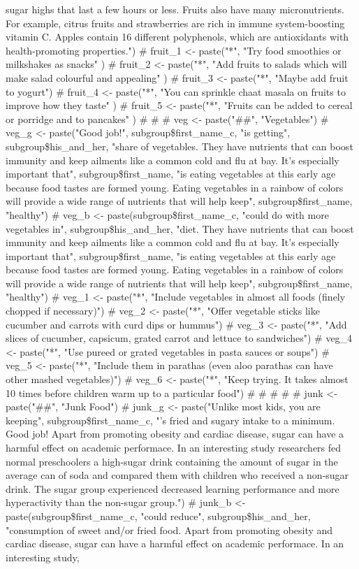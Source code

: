 \documentclass[]{article}
\begin{document}
sugar highs that last a few hours or less. Fruits also have many micronutrients. For example, citrus fruits and strawberries are rich in immune system-boosting vitamin C. Apples contain 16 different polyphenols, which are antioxidants with health-promoting properties.") \# fruit\_1 \textless{}- paste("*", "Try food smoothies or milkshakes as snacks" ) \# fruit\_2 \textless{}- paste("*", "Add fruits to salads which will make salad colourful and appealing" ) \# fruit\_3 \textless{}- paste("*", "Maybe add fruit to yogurt") \# fruit\_4 \textless{}- paste("*", "You can sprinkle chaat masala on fruits to improve how they taste" ) \# fruit\_5 \textless{}- paste("*", "Fruits can be added to cereal or porridge and to pancakes" ) \#  \#  \# veg \textless{}- paste("\#\#", "Vegetables") \# veg\_g \textless{}- paste("Good job!", subgroup\$first\_name\_c, "is getting", subgroup\$his\_and\_her, "share of vegetables. They have nutrients that can boost immunity and keep ailments like a common cold and flu at bay. It's especially important that", subgroup\$first\_name, "is eating vegetables at this early age because food tastes are formed young. Eating vegetables in a rainbow of colors will provide a wide range of nutrients that will help keep", subgroup\$first\_name, "healthy") \# veg\_b \textless{}- paste(subgroup\$first\_name\_c, "could do with more vegetables in", subgroup\$his\_and\_her, "diet. They have nutrients that can boost immunity and keep ailments like a common cold and flu at bay. It's especially important that", subgroup\$first\_name, "is eating vegetables at this early age because food tastes are formed young. Eating vegetables in a rainbow of colors will provide a wide range of nutrients that will help keep", subgroup\$first\_name, "healthy") \# veg\_1 \textless{}- paste("*", "Include vegetables in almost all foods (finely chopped if necessary)") \# veg\_2 \textless{}- paste("*", "Offer vegetable sticks like cucumber and carrots with curd dips or hummus") \# veg\_3 \textless{}- paste("*", "Add slices of cucumber, capsicum, grated carrot and lettuce to sandwiches") \# veg\_4 \textless{}- paste("*", "Use pureed or grated vegetables in pasta sauces or soups") \# veg\_5 \textless{}- paste("*", "Include them in parathas (even aloo parathas can have other mashed vegetables)") \# veg\_6 \textless{}- paste("*", "Keep trying. It takes almost 10 times before children warm up to a particular food") \#  \#  \#  \#  \# junk \textless{}- paste("\#\#", "Junk Food") \# junk\_g \textless{}- paste("Unlike most kids, you are keeping", subgroup\$first\_name\_c, "'s fried and sugary intake to a minimum. Good job! Apart from promoting obesity and cardiac disease, sugar can have a harmful effect on academic performace. In an interesting study researchers fed normal preschoolers a high-sugar drink containing the amount of sugar in the average can of soda and compared them with children who received a non-sugar drink. The sugar group experienced decreased learning performance and more hyperactivity than the non-sugar group.") \# junk\_b \textless{}- paste(subgroup\$first\_name\_c, "could reduce", subgroup\$his\_and\_her, "consumption of sweet and/or fried food. Apart from promoting obesity and cardiac disease, sugar can have a harmful effect on academic performace. In an interesting study, 
\end{document}
